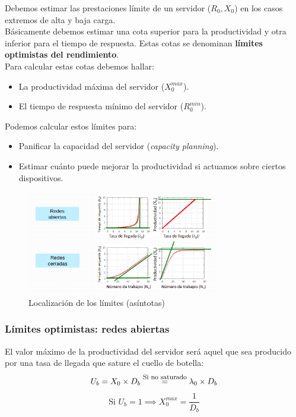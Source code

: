 \documentclass[12pt,spanish]{article}
\begin{document}
Debemos estimar las prestaciones límite de un servidor ($R_0, X_0$) en los casos extremos de alta y baja carga.\\

Básicamente debemos estimar una cota superior para la productividad y otra inferior para el tiempo de respuesta. Estas cotas se denominan \textbf{límites optimistas del rendimiento}. \\

Para calcular estas cotas debemos hallar:
\begin{itemize}
	\item La productividad máxima del servidor ($X_0^{max}$).
	\item El tiempo de respuesta mínimo del servidor ($R_0^{min}$).
\end{itemize}

Podemos calcular estos límites para:
\begin{itemize}
	\item Panificar la capacidad del servidor (\textit{capacity planning}).
	\item Estimar cuánto puede mejorar la productividad si actuamos sobre ciertos dispositivos.
\end{itemize}

\begin{figure}[H]
	\centering
	\includegraphics[width=0.75\textwidth]{asintotas.png}
	\caption{Localización de los límites (asíntotas)}
\end{figure}

\subsubsection{Límites optimistas: redes abiertas}

El valor máximo de la productividad del servidor será aquel que sea producido por una tasa de llegada que sature el cuello de botella:
\begin{equation*}
	U_b=X_0 \times D_b \stackrel{\text{\footnotesize{Si no saturado}}}{=} \lambda_0 \times D_b
\end{equation*}
\begin{equation*}
	\text{Si } U_b=1 \implies X_0^{max} = \frac{1}{D_b}
\end{equation*}
\end{document}
